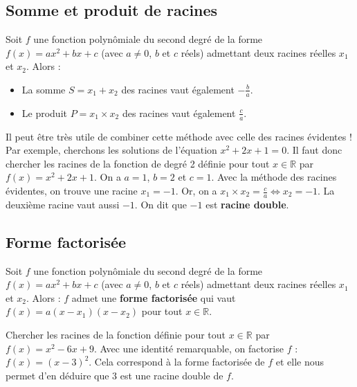 	\subsection{Somme et produit de racines}
	
	\begin{formula}[Relations]
		Soit $f$ une fonction polynômiale du second degré de la forme $f(x) = ax^2 + bx +c$ (avec $a \neq 0$, $b$ et $c$ réels) admettant deux racines réelles $x_1$ et $x_2$. Alors :
		\begin{itemize}
			\item La somme $S = x_1 + x_2$ des racines vaut également $\displaystyle{-\frac{b}{a}}$.
			\item Le produit $P = x_1 \times x_2$ des racines vaut également $\displaystyle{\frac{c}{a}}$.
		\end{itemize}
	\end{formula}
	
	\begin{tip}[Exemple]
		Il peut être très utile de combiner cette méthode avec celle des racines évidentes !
		Par exemple, cherchons les solutions de l'équation $x^2 + 2x + 1 = 0$.
		\newpar
		Il faut donc chercher les racines de la fonction de degré 2 définie pour tout $x \in \mathbb{R}$ par $f(x) = x^2 + 2x + 1$.
		\newpar
		On a $a = 1$, $b = 2$ et $c = 1$. Avec la méthode des racines évidentes, on trouve une racine $x_1 = -1$.
		\newpar
		Or, on a $\displaystyle{x_1 \times x_2 = \frac{c}{a} \iff x_2 = -1}$. La deuxième racine vaut aussi $-1$.
		\newpar
		On dit que $-1$ est \textbf{racine double}.
	\end{tip}
	
	\subsection{Forme factorisée}
	
	\begin{formula}[Définition]
		Soit $f$ une fonction polynômiale du second degré de la forme $f(x) = ax^2 + bx +c$ (avec $a \neq 0$, $b$ et $c$ réels) admettant deux racines réelles $x_1$ et $x_2$. Alors :
		\newpar
		$f$ admet une \textbf{forme factorisée} qui vaut $f(x) = a(x-x_1)(x-x_2)$ pour tout $x \in \mathbb{R}$.
	\end{formula}
	
	\begin{tip}[Exemple]
		Chercher les racines de la fonction définie pour tout $x \in \mathbb{R}$ par $f(x) = x^2 - 6x + 9$.
		\newpar
		Avec une identité remarquable, on factorise $f$ : $f(x) = (x - 3)^2$.
		\newpar
		Cela correspond à la forme factorisée de $f$ et elle nous permet d'en déduire que $3$ est une racine double de $f$.
	\end{tip}
	
